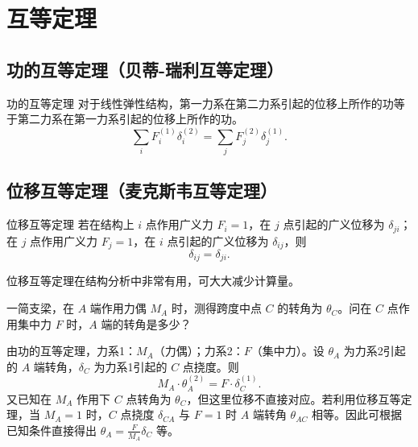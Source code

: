\section{互等定理}

\subsection{功的互等定理（贝蒂-瑞利互等定理）}
\begin{myTheorem}{功的互等定理}
    对于线性弹性结构，第一力系在第二力系引起的位移上所作的功等于第二力系在第一力系引起的位移上所作的功。
    \[
    \sum_{i} F_i^{(1)} \delta_i^{(2)} = \sum_{j} F_j^{(2)} \delta_j^{(1)}.
    \]
\end{myTheorem}

\subsection{位移互等定理（麦克斯韦互等定理）}
\begin{myTheorem}{位移互等定理}
    若在结构上 \(i\) 点作用广义力 \(F_i=1\)，在 \(j\) 点引起的广义位移为 \(\delta_{ji}\)；在 \(j\) 点作用广义力 \(F_j=1\)，在 \(i\) 点引起的广义位移为 \(\delta_{ij}\)，则
    \[
    \delta_{ij} = \delta_{ji}.
    \]
\end{myTheorem}
位移互等定理在结构分析中非常有用，可大大减少计算量。

\begin{example}
    一简支梁，在 \(A\) 端作用力偶 \(M_A\) 时，测得跨度中点 \(C\) 的转角为 \(\theta_C\)。问在 \(C\) 点作用集中力 \(F\) 时，\(A\) 端的转角是多少？
\end{example}
\begin{solution}
    由功的互等定理，力系1：\(M_A\)（力偶）；力系2：\(F\)（集中力）。设 \(\theta_A\) 为力系2引起的 \(A\) 端转角，\(\delta_C\) 为力系1引起的 \(C\) 点挠度。则
    \[
    M_A \cdot \theta_A^{(2)} = F \cdot \delta_C^{(1)}.
    \]
    又已知在 \(M_A\) 作用下 \(C\) 点转角为 \(\theta_C\)，但这里位移不直接对应。若利用位移互等定理，当 \(M_A=1\) 时，\(C\) 点挠度 \(\delta_{CA}\) 与 \(F=1\) 时 \(A\) 端转角 \(\theta_{AC}\) 相等。因此可根据已知条件直接得出 \(\theta_A = \frac{F}{M_A}\delta_C\) 等。
\end{solution}



